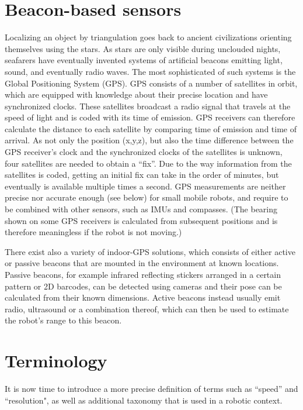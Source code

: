 \section{Beacon-based sensors}
Localizing an object by triangulation goes back to ancient civilizations orienting themselves using the stars. As stars are only visible during unclouded nights, seafarers have eventually invented systems of artificial beacons emitting light, sound, and eventually radio waves. The most sophisticated of such systems is the Global Positioning System (GPS). GPS consists of a number of satellites in orbit, which are equipped with knowledge about their precise location and have synchronized clocks. These satellites broadcast a radio signal that travels at the speed of light and is coded with its time of emission. GPS receivers can therefore calculate the distance to each satellite by comparing time of emission and time of arrival. As not only the position (x,y,z), but also the time difference between the GPS receiver's clock and the synchronized clocks of the satellites is unknown, four satellites are needed to obtain a ``fix''. Due to the way information from the satellites is coded, getting an initial fix can take in the order of minutes, but eventually is available multiple times a second. GPS measurements are neither precise nor accurate enough (see below) for small mobile robots, and require to be combined with other sensors, such as IMUs and compasses. (The bearing shown on some GPS receivers is calculated from subsequent positions and is therefore meaningless if the robot is not moving.)

There exist also a variety of indoor-GPS solutions, which consists of either active or passive beacons that are mounted in the environment at known locations. Passive beacons, for example infrared reflecting stickers arranged in a certain pattern or 2D barcodes, can be detected using cameras and their pose can be calculated from their known dimensions. Active beacons instead usually emit radio, ultrasound or a combination thereof, which can then be used to estimate the robot's range to this beacon.

\section{Terminology}
It is now time to introduce  a more precise definition of terms such as ``speed'' and ``resolution", as well as additional taxonomy that is used in a robotic context. %

